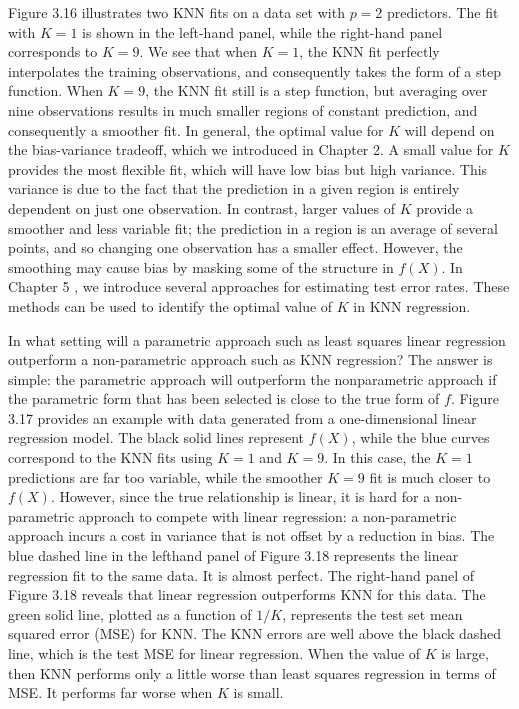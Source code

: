 \documentclass[10pt]{article}
\begin{document}
Figure 3.16 illustrates two KNN fits on a data set with $p=2$ predictors. The fit with $K=1$ is shown in the left-hand panel, while the right-hand panel corresponds to $K=9$. We see that when $K=1$, the KNN fit perfectly interpolates the training observations, and consequently takes the form of a step function. When $K=9$, the KNN fit still is a step function, but averaging over nine observations results in much smaller regions of constant prediction, and consequently a smoother fit. In general, the optimal value for $K$ will depend on the bias-variance tradeoff, which we introduced in Chapter 2. A small value for $K$ provides the most flexible fit, which will have low bias but high variance. This variance is due to the fact that the prediction in a given region is entirely dependent on just one observation. In contrast, larger values of $K$ provide a smoother and less variable fit; the prediction in a region is an average of several points, and so changing one observation has a smaller effect. However, the smoothing may cause bias by masking some of the structure in $f(X)$. In Chapter 5 , we introduce several approaches for estimating test error rates. These methods can be used to identify the optimal value of $K$ in KNN regression.


In what setting will a parametric approach such as least squares linear regression outperform a non-parametric approach such as KNN regression? The answer is simple: the parametric approach will outperform the nonparametric approach if the parametric form that has been selected is close to the true form of $f$. Figure 3.17 provides an example with data generated from a one-dimensional linear regression model. The black solid lines represent $f(X)$, while the blue curves correspond to the KNN fits using $K=1$ and $K=9$. In this case, the $K=1$ predictions are far too variable, while the smoother $K=9$ fit is much closer to $f(X)$. However, since the true relationship is linear, it is hard for a non-parametric approach to compete with linear regression: a non-parametric approach incurs a cost in variance that is not offset by a reduction in bias. The blue dashed line in the lefthand panel of Figure 3.18 represents the linear regression fit to the same data. It is almost perfect. The right-hand panel of Figure 3.18 reveals that linear regression outperforms KNN for this data. The green solid line, plotted as a function of $1 / K$, represents the test set mean squared error (MSE) for KNN. The KNN errors are well above the black dashed line, which is the test MSE for linear regression. When the value of $K$ is large, then KNN performs only a little worse than least squares regression in terms of MSE. It performs far worse when $K$ is small.
\end{document}
